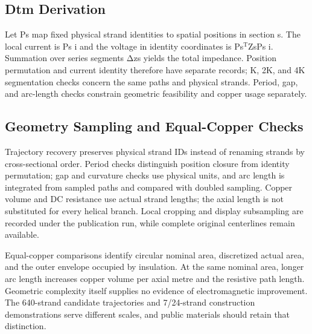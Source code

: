 \documentclass[journal,10pt]{IEEEtran}
\begin{document}
\subsection*{Dtm Derivation}
\hypertarget{05.dtm_derivation.heading}{}
Let Ps map fixed physical strand identities to spatial positions in section s. The local current is Ps i and the voltage in identity coordinates is Ps\(^{\mathrm T}\)ZsPs i. Summation over series segments Δzs yields the total impedance. Position permutation and current identity therefore have separate records; K, 2K, and 4K segmentation checks concern the same paths and physical strands. Period, gap, and arc-length checks constrain geometric feasibility and copper usage separately.


\subsection*{Geometry Sampling and Equal-Copper Checks}
\hypertarget{05.report_geometry.heading}{}
Trajectory recovery preserves physical strand IDs instead of renaming strands by cross-sectional order. Period checks distinguish position closure from identity permutation; gap and curvature checks use physical units, and arc length is integrated from sampled paths and compared with doubled sampling. Copper volume and DC resistance use actual strand lengths; the axial length is not substituted for every helical branch. Local cropping and display subsampling are recorded under the publication run, while complete original centerlines remain available.


Equal-copper comparisons identify circular nominal area, discretized actual area, and the outer envelope occupied by insulation. At the same nominal area, longer arc length increases copper volume per axial metre and the resistive path length. Geometric complexity itself supplies no evidence of electromagnetic improvement. The 640-strand candidate trajectories and 7/24-strand construction demonstrations serve different scales, and public materials should retain that distinction.
\end{document}
